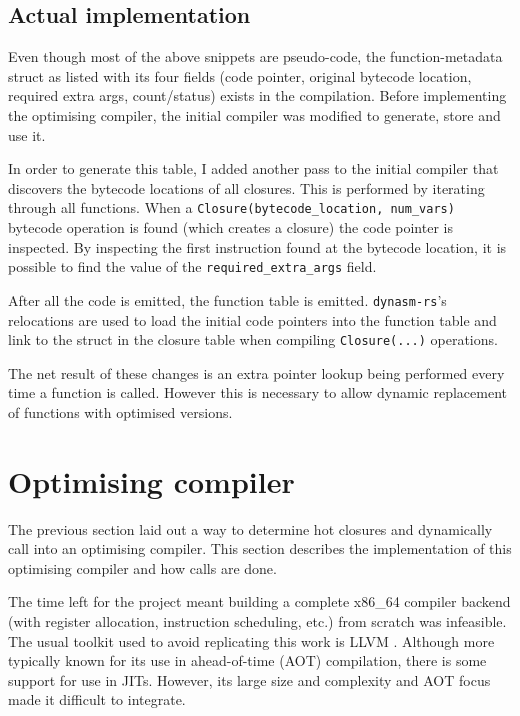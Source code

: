 \subsection{Actual implementation}

Even though most of the above snippets are pseudo-code, the function-metadata struct as listed with
its four fields (code pointer, original bytecode location, required extra args, count/status)
exists in the compilation. Before implementing the optimising compiler, the initial compiler was
modified to generate, store and use it.

In order to generate this table, I added another pass to the initial compiler that discovers the
bytecode locations of all closures. This is performed by iterating through all functions. When a
\texttt{Closure(bytecode\_location, num\_vars)} bytecode operation is found (which creates a
closure) the code pointer is inspected. By inspecting the first instruction found at the bytecode
location, it is possible to find the value of the \texttt{required\_extra\_args} field.

After all the code is emitted, the function table is emitted. \texttt{dynasm-rs}'s relocations are
used to load the initial code pointers into the function table and link to the struct in the
closure table when compiling \texttt{Closure(...)} operations.

The net result of these changes is an extra pointer lookup being performed every time a function is
called. However this is necessary to allow dynamic replacement of functions with optimised
versions.

\section{Optimising compiler} \label{opt-comp}

The previous section laid out a way to determine hot closures and dynamically call into an
optimising compiler. This section describes the implementation of this optimising compiler and how
calls are done.

The time left for the project meant building a complete x86\_64 compiler backend (with register
allocation,
instruction scheduling, etc.) from scratch was infeasible. The usual toolkit used to avoid
replicating this work is LLVM \cite{llvm}. Although more typically known for its use in
ahead-of-time (AOT) compilation, there is some support for use in JITs. However, its large size and
complexity and AOT focus made it difficult to integrate.

